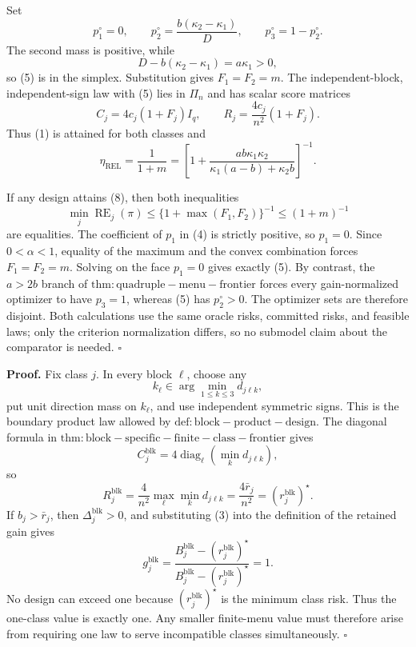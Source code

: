 Set
\[
p_1^\circ=0,
\qquad
p_2^\circ=\frac{b(\kappa_2-\kappa_1)}D,
\qquad
p_3^\circ=1-p_2^\circ. \tag{5}
\]
The second mass is positive, while
\[
D-b(\kappa_2-\kappa_1)=a\kappa_1>0, \tag{6}
\]
so (5) is in the simplex.  Substitution gives \(F_1=F_2=m\).  The independent-block, independent-sign law with (5) lies in \(\Pi_n\) and has scalar score matrices
\[
C_j=4c_j(1+F_j)I_q,
\qquad
R_j=\frac{4c_j}{n^2}(1+F_j). \tag{7}
\]
Thus (1) is attained for both classes and
\[
\eta_{\mathrm{REL}}
=\frac1{1+m}
=\left[1+\frac{ab\kappa_1\kappa_2}
{\kappa_1(a-b)+\kappa_2b}\right]^{-1}. \tag{8}
\]

If any design attains (8), then both inequalities
\[
\min_j\operatorname{RE}_j(\pi)
\le\{1+\max(F_1,F_2)\}^{-1}
\le(1+m)^{-1} \tag{9}
\]
are equalities.  The coefficient of \(p_1\) in (4) is strictly positive, so \(p_1=0\).  Since \(0<\alpha<1\), equality of the maximum and the convex combination forces \(F_1=F_2=m\).  Solving on the face \(p_1=0\) gives exactly (5).  By contrast, the \(a>2b\) branch of \(\mathrm{thm:quadruple-menu-frontier}\) forces every gain-normalized optimizer to have \(p_3=1\), whereas (5) has \(p_2^\circ>0\).  The optimizer sets are therefore disjoint.  Both calculations use the same oracle risks, committed risks, and feasible laws; only the criterion normalization differs, so no submodel claim about the comparator is needed. \(\square\)

\textbf{Proof.}
Fix class \(j\).  In every block \(\ell\), choose any
\[
k_\ell\in\arg\min_{1\le k\le3}d_{j\ell k}, \tag{1}
\]
put unit direction mass on \(k_\ell\), and use independent symmetric signs.  This is the boundary product law allowed by \(\mathrm{def:block-product-design}\).  The diagonal formula in \(\mathrm{thm:block-specific-finite-class-frontier}\) gives
\[
C_j^{\mathrm{blk}}
=4\operatorname{diag}_{\ell}
\left(\min_kd_{j\ell k}\right), \tag{2}
\]
so
\[
R_j^{\mathrm{blk}}
=\frac4{n^2}\max_\ell\min_kd_{j\ell k}
=\frac{4\bar r_j}{n^2}
=(r_j^{\mathrm{blk}})^\star. \tag{3}
\]
If \(b_j>\bar r_j\), then \(\Delta_j^{\mathrm{blk}}>0\), and substituting (3) into the definition of the retained gain gives
\[
g_j^{\mathrm{blk}}
=\frac{B_j^{\mathrm{blk}}-(r_j^{\mathrm{blk}})^\star}
{B_j^{\mathrm{blk}}-(r_j^{\mathrm{blk}})^\star}=1. \tag{4}
\]
No design can exceed one because \((r_j^{\mathrm{blk}})^\star\) is the minimum class risk.  Thus the one-class value is exactly one.  Any smaller finite-menu value must therefore arise from requiring one law to serve incompatible classes simultaneously. \(\square\)

